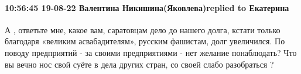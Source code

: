  
 
 
 
 

\paragraph{10:56:45 19-08-22 Валентина Никишина(Яковлева)replied to Екатерина}

А , ответьте мне, какое вам, саратовцам дело до нашего долга, кстати только
благодаря «великим асвабадителям», русским фашистам, долг увеличился. По поводу
предприятий - за своими предприятиями - нет желание понаблюдать? Что вы вечно
нос свой суёте в дела других стран, со своей слабо разобраться ?
